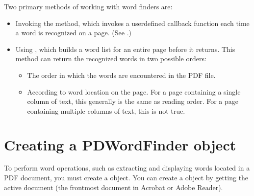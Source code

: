 \documentclass[letterpaper,12pt,english,openany,oneside]{sphinxmanual}
\begin{document}
Two primary methods of working with word finders are:
\begin{itemize}
\item {} 
Invoking the  method, which invokes a user\sphinxhyphen{}defined callback function each time a word is recognized on a page. (See .)

\item {} 
Using , which builds a word list for an entire page before it returns. This method can return the recognized words in two possible orders:
\begin{itemize}
\item {} 
The order in which the words are encountered in the PDF file.

\item {} 
According to word location on the page. For a page containing a single column of text, this generally is the same as reading order. For a page containing multiple columns of text, this is not true.

\end{itemize}

\end{itemize}


\section{Creating a PDWordFinder object}
\label{\detokenize{Plugins_Words:creating-a-pdwordfinder-object}}
To perform word operations, such as extracting and displaying words located in a PDF document, you must create a  object. You can create a  object by getting the active document (the frontmost document in Acrobat or Adobe Reader).
\end{document}
